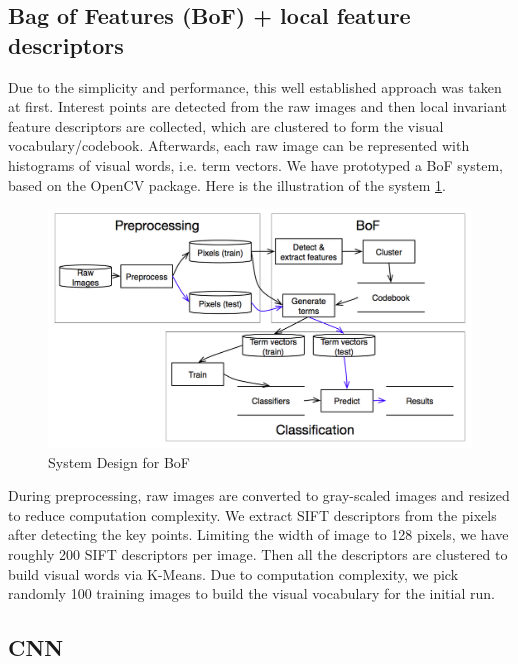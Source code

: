 \documentclass[journal]{IEEEtran}
\begin{document}
\subsection{Bag of Features (BoF) + local feature descriptors}
   Due to the simplicity and performance, this well established approach was taken at first. Interest points are detected from the raw images and then local invariant feature descriptors are collected, which are clustered to form the visual vocabulary/codebook. Afterwards, each raw image can be represented with histograms of visual words, i.e. term vectors.  We have prototyped a BoF system, based on the OpenCV package.  Here is the illustration of the system \ref{fig:bofsystemdesign}.
\newpage
\graphicspath{{../milestone/}}
\begin{figure} 
  \centering
  \includegraphics[scale=0.2]{flowchart}
  \caption{ System Design for BoF }
  \label{fig:bofsystemdesign}
\end{figure}
During preprocessing, raw images are converted to gray-scaled images and resized to reduce computation complexity. We extract SIFT descriptors from the pixels after detecting the key points. Limiting the width of image to 128 pixels, we have roughly 200 SIFT descriptors per image. Then all the descriptors are clustered to build visual words via K-Means. Due to computation complexity, we pick randomly 100 training images to build the visual vocabulary for the initial run.  
\subsection{CNN}

\end{document}

